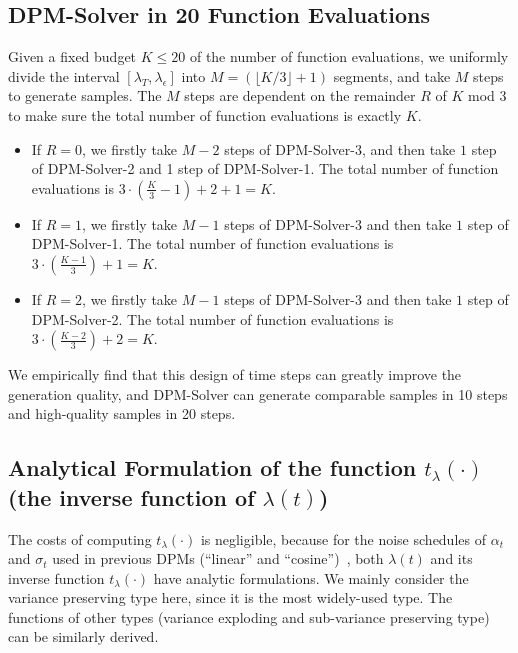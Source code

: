 \subsection{DPM-Solver in 20 Function Evaluations}
\label{appendix:dpm-solver-fast}
Given a fixed budget $K\leq 20$ of the number of function evaluations, we uniformly divide the interval $[\lambda_T, \lambda_\epsilon]$ into $M = (\lfloor K / 3\rfloor + 1)$ segments, and take $M$ steps to generate samples. The $M$ steps are dependent on the remainder $R$ of $K$ mod $3$ to make sure the total number of function evaluations is exactly $K$.

\begin{itemize}
\item 
If $R = 0$, we firstly take $M - 2$ steps of DPM-Solver-3, and then take $1$ step of DPM-Solver-2 and 1 step of DPM-Solver-1. The total number of function evaluations is $3\cdot(\frac{K}{3} - 1) + 2 + 1 = K$.

    \item 
If $R = 1$, we firstly take $M - 1$ steps of DPM-Solver-3 and then take $1$ step of DPM-Solver-1. The total number of function evaluations is $3\cdot(\frac{K-1}{3}) + 1=K$.

    \item 
If $R = 2$, we firstly take $M - 1$ steps of DPM-Solver-3 and then take $1$ step of DPM-Solver-2. The total number of function evaluations is $3\cdot(\frac{K-2}{3}) + 2 = K$.
\end{itemize}

We empirically find that this design of time steps can greatly improve the generation quality, and DPM-Solver can generate comparable samples in 10 steps and high-quality samples in 20 steps.



\subsection{Analytical Formulation of the function $t_\lambda(\cdot)$ (the inverse function of $\lambda(t)$)}
The costs of computing $t_\lambda(\cdot)$ is negligible, because for the noise schedules of $\alpha_t$ and $\sigma_t$ used in previous DPMs (``linear'' and ``cosine'')~\citep{ho2020denoising,nichol2021improved}, both $\lambda(t)$ and its inverse function $t_\lambda(\cdot)$ have analytic formulations. We mainly consider the variance preserving type here, since it is the most widely-used type. The functions of other types (variance exploding and sub-variance preserving type) can be similarly derived.

